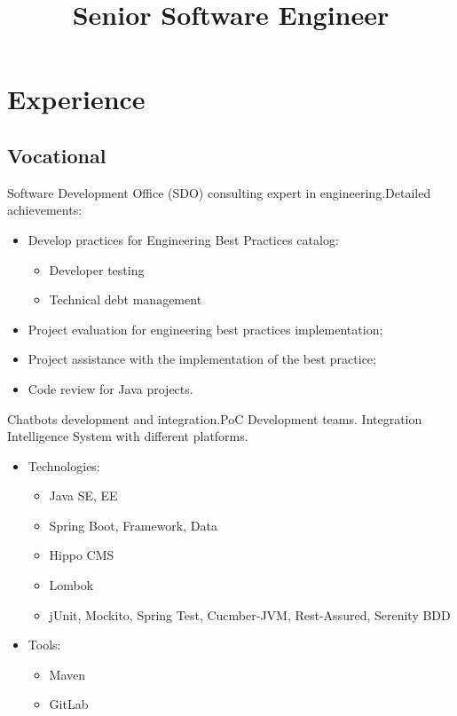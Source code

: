 \documentclass[11pt, a4paper]{moderncv}
\title{Senior Software Engineer}
\begin{document}
\makecvtitle

\section{Experience}
\subsection{Vocational}
{Software Development Office (SDO) consulting expert in engineering.\newline{}Detailed achievements:
\begin{itemize}
\item Develop practices for Engineering Best Practices catalog:
\begin{itemize}
\item Developer testing
\item Technical debt management
\end{itemize}
\item Project evaluation for engineering best practices implementation;
\item Project assistance with the implementation of the best practice;
\item Code review for Java projects.
\end{itemize}}

{Chatbots development and integration.\newline{}PoC Development teams. Integration Intelligence System with different platforms.
\begin{itemize}
\item Technologies:
\begin{itemize}
\item Java SE, EE
\item Spring Boot, Framework, Data
\item Hippo CMS
\item Lombok
\item jUnit, Mockito, Spring Test, Cucmber-JVM, Rest-Assured, Serenity BDD  
\end{itemize}
\item Tools:
\begin{itemize}
\item Maven
\item GitLab 
\end{itemize}
\end{itemize}}
\end{document}
